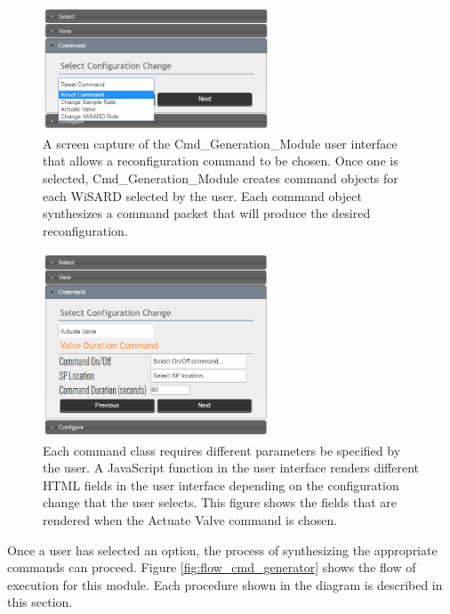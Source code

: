 \begin{figure}[H]
	\centering
	\includegraphics[width=0.6\textwidth]{figures/jsp_ui_cmd.png}
	\caption{A screen capture of the Cmd\_Generation\_Module user interface that allows a reconfiguration command to be chosen. Once one is selected, Cmd\_Generation\_Module creates command objects for each WiSARD selected by the user. Each command object synthesizes a command packet that will produce the desired reconfiguration.}
	\label{fig:jsp_ui_cmd}
\end{figure}

\begin{figure}[H]
	\centering
	\includegraphics[width=0.6\textwidth]{figures/jsp_ui_cmd_parameters.png}
	\caption{Each command class requires different parameters be specified by the user. A JavaScript function in the user interface renders different HTML fields in the user interface depending on the configuration change that the user selects. This figure shows the fields that are rendered when the Actuate Valve command is chosen.}
	\label{fig:jsp_ui_cmd_params}
\end{figure}

Once a user has selected an option, the process of synthesizing the appropriate commands can proceed. Figure \ref{fig:flow_cmd_generator} shows the flow of execution for this module. Each procedure shown in the diagram is described in this section.\\


